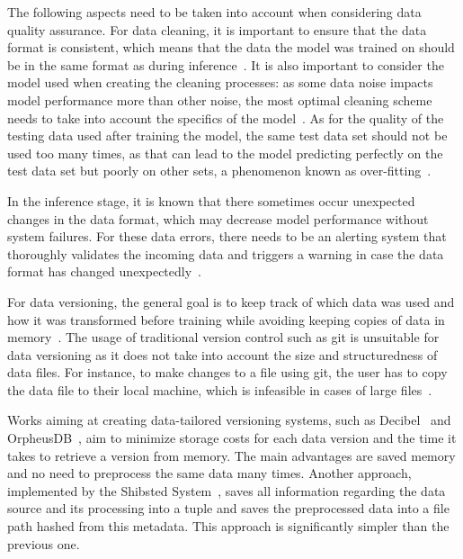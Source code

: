 \enlargethispage{7mm}
The following aspects need to be taken into account when considering data quality assurance. For data cleaning, it is important to ensure that the data format is consistent, which means that the data the model was trained on should be in the same format as during inference~\cite{polyzotisDataLifecycleChallenges2018}. It is also important to consider the model used when creating the cleaning processes: as some data noise impacts model performance more than other noise, the most optimal cleaning scheme needs to take into account the specifics of the model~\cite{renggliDataQualityDrivenView2021}. As for the quality of the testing data used after training the model, the same test data set should not be used too many times, as that can lead to the model predicting perfectly on the test data set but poorly on other sets, a phenomenon known as over-fitting~\cite{renggliDataQualityDrivenView2021}.

In the inference stage, it is known that there sometimes occur unexpected changes in the data format, which may decrease model performance without system failures. For these data errors, there needs to be an alerting system that thoroughly validates the incoming data and triggers a warning in case the data format has changed unexpectedly~\cite{polyzotisDataLifecycleChallenges2018}.

For data versioning, the general goal is to keep track of which data was used and how it was transformed before training while avoiding keeping copies of data in memory~\cite{maddoxDecibelRelationalDataset2016}. The usage of traditional version control such as git is unsuitable for data versioning as it does not take into account the size and structuredness of data files. For instance, to make changes to a file using git, the user has to copy the data file to their local machine, which is infeasible in cases of large files~\cite{maddoxDecibelRelationalDataset2016}.

Works aiming at creating data-tailored versioning systems, such as Decibel~\cite{maddoxDecibelRelationalDataset2016} and OrpheusDB~\cite{huangEffectiveDataVersioning2019}, aim to minimize storage costs for each data version and the time it takes to retrieve a version from memory. The main advantages are saved memory and no need to preprocess the same data many times. Another approach, implemented by the Shibsted System~\cite{vanderweideVersioningEndtoEndMachine2017}, saves all information regarding the data source and its processing into a tuple and saves the preprocessed data into a file path hashed from this metadata. This approach is significantly simpler than the previous one.

